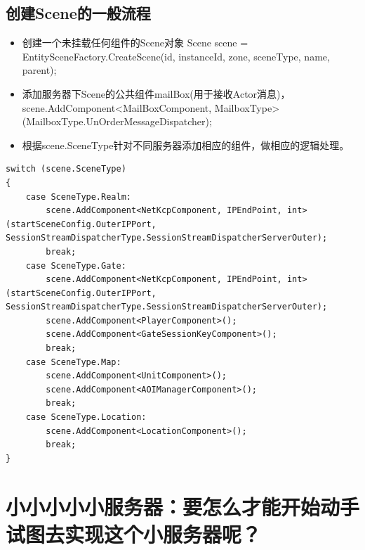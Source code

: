 \documentclass[9pt, b5paper]{article}
\begin{document}
\subsection{创建Scene的一般流程}
\label{sec-2-6}
\begin{itemize}
\item 创建一个未挂载任何组件的Scene对象 Scene scene = EntitySceneFactory.CreateScene(id, instanceId, zone, sceneType, name, parent);
\item 添加服务器下Scene的公共组件mailBox(用于接收Actor消息)，scene.AddComponent<MailBoxComponent, MailboxType>(MailboxType.UnOrderMessageDispatcher);
\item 根据scene.SceneType针对不同服务器添加相应的组件，做相应的逻辑处理。
\end{itemize}
\begin{verbatim}
switch (scene.SceneType)
{
	case SceneType.Realm:
		scene.AddComponent<NetKcpComponent, IPEndPoint, int>(startSceneConfig.OuterIPPort, SessionStreamDispatcherType.SessionStreamDispatcherServerOuter);
		break;
 	case SceneType.Gate:
        scene.AddComponent<NetKcpComponent, IPEndPoint, int>(startSceneConfig.OuterIPPort, SessionStreamDispatcherType.SessionStreamDispatcherServerOuter);
        scene.AddComponent<PlayerComponent>();
        scene.AddComponent<GateSessionKeyComponent>();
        break;
   	case SceneType.Map:
        scene.AddComponent<UnitComponent>();
        scene.AddComponent<AOIManagerComponent>();
        break;
    case SceneType.Location:
        scene.AddComponent<LocationComponent>();
        break;
}
\end{verbatim}
\section{小小小小小服务器：要怎么才能开始动手试图去实现这个小服务器呢？}
\label{sec-3}
\end{document}
